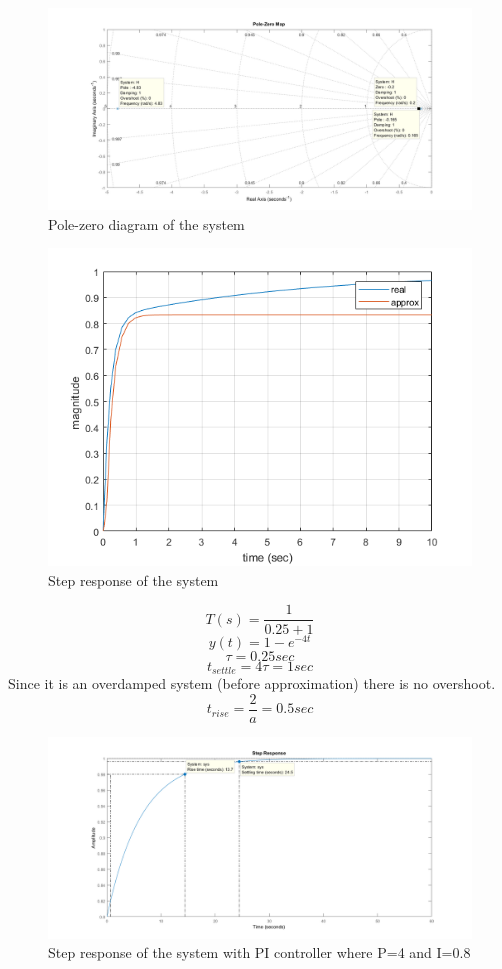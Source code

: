 \documentclass[11pt]{article}
\begin{document}
\begin{figure}[H]
  \includegraphics[scale=0.7, center]{polezero}
  \caption{Pole-zero diagram of the system}
  \label{fig:zero}
\end{figure}
\begin{figure}[H]
  \includegraphics[scale=0.7, center]{approx}
  \caption{Step response of the system}
  \label{fig:zero}
\end{figure}
$$T(s)=\frac{1}{0.25+1}$$
$$y(t)=1-e^{-4t}$$
$$\tau=0.25 sec$$
$$t_{settle}=4\tau=1 sec$$
Since it is an overdamped system (before approximation) there is no overshoot.
$$t_{rise}=\frac{2}{a}=0.5 sec$$

\begin{figure}[H]
  \includegraphics[scale=0.7, center]{step2}
  \caption{Step response of the system with PI controller where P=4 and I=0.8}
  \label{fig:zero}
\end{figure}
\end{document}
